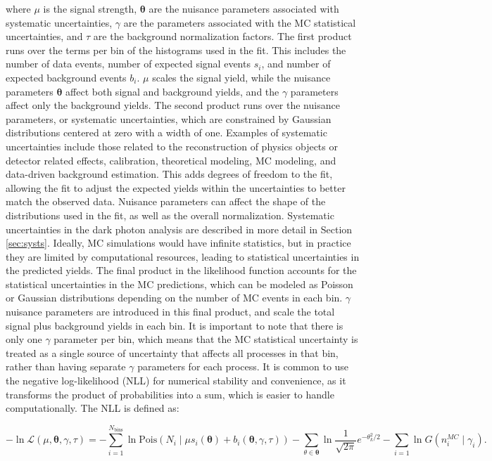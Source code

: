 where $\mu$ is the signal strength, $\boldsymbol{\theta}$ are the nuisance parameters associated with systematic uncertainties, $\gamma$ are the parameters associated with the MC statistical uncertainties, and $\tau$ are the background normalization factors.
The first product runs over the terms per bin of the histograms used in the fit.
This includes the number of data events, number of expected signal events $s_i$, and number of expected background events $b_i$.
$\mu$ scales the signal yield, while the nuisance parameters $\boldsymbol{\theta}$ affect both signal and background yields, and the $\gamma$ parameters affect only the background yields.
The second product runs over the nuisance parameters, or systematic uncertainties, which are constrained by Gaussian distributions centered at zero with a width of one.
Examples of systematic uncertainties include those related to the reconstruction of physics objects or detector related effects, calibration, theoretical modeling, MC modeling, and data-driven background estimation.
This adds degrees of freedom to the fit, allowing the fit to adjust the expected yields within the uncertainties to better match the observed data.
Nuisance parameters can affect the shape of the distributions used in the fit, as well as the overall normalization.
Systematic uncertainties in the dark photon analysis are described in more detail in Section \ref{sec:systs}.
Ideally, MC simulations would have infinite statistics, but in practice they are limited by computational resources, leading to statistical uncertainties in the predicted yields.
The final product in the likelihood function accounts for the statistical uncertainties in the MC predictions, which can be modeled as Poisson or Gaussian distributions depending on the number of MC events in each bin.
$\gamma$ nuisance parameters are introduced in this final product, and scale the total signal plus background yields in each bin.
It is important to note that there is only one $\gamma$ parameter per bin, which means that the MC statistical uncertainty is treated as a single source of uncertainty that affects all processes in that bin, rather than having separate $\gamma$ parameters for each process.
It is common to use the negative log-likelihood (NLL) for numerical stability and convenience, as it transforms the product of probabilities into a sum, which is easier to handle computationally.
The NLL is defined as:

\begin{equation}\label{eq:nll}
    -\ln\mathcal{L}(\mu,\boldsymbol{\theta}, \gamma, \tau) = -\sum_{i=1}^{N_{\text{bins}}} \ln \mathrm{Pois}\!\left(N_i \mid \mu s_i(\boldsymbol{\theta}) +b_i(\boldsymbol{\theta},\gamma,\tau)\right) - \sum_{\theta\in\boldsymbol{\theta}} \ln \frac{1}{\sqrt{2\pi}}e^{-\theta_k^2/2} - \sum_{i=1} \ln G\!\left(n^{MC}_i \mid \gamma_i\right).
\end{equation}

